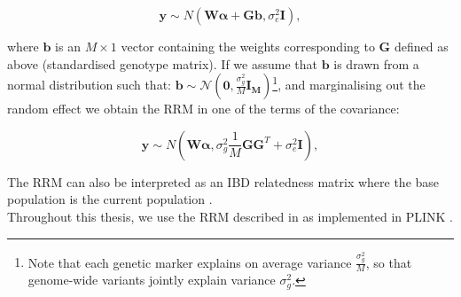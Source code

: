 \begin{equation}\label{eq:polygenic_model}
    \mathbf{y} \sim N (\mathbf{W}\boldsymbol{\alpha} +  \mathbf{G}\mathbf{b}, \sigma_e^2\mathbf{I}),
\end{equation}

where $\mathbf{b}$ is an $M \times 1$ vector containing the weights corresponding to $\mathbf{G}$ defined as above (standardised genotype matrix).
If we assume that $\mathbf{b}$ is drawn from a normal distribution such that: $\mathbf{b} \sim \mathcal{N}(\mathbf{0}, \frac{\sigma_g^2}{M} \mathbf{I_M})$\footnote{Note that each genetic marker explains on average variance $\frac{\sigma_g^2}{M}$, so that genome-wide variants jointly explain variance $\sigma_g^2$.}, and marginalising out the random effect we obtain the RRM in one of the terms of the covariance:

\begin{equation}\label{eq:polygenic_model_MVN}
    \mathbf{y} \sim N (\mathbf{W}\boldsymbol{\alpha}, \sigma_g^2\frac{1}{M}\mathbf{G}\mathbf{G}^T + \sigma_e^2\mathbf{I} ),
\end{equation}

The $\mathrm{RRM}$ can also be interpreted as an IBD relatedness matrix where the base population
is the current population \cite{powell2010reconciling}. \\

Throughout this thesis, we use the $\mathrm{RRM}$ described in \cite{yang2011gcta} as implemented in PLINK \cite{purcell2007plink}.







